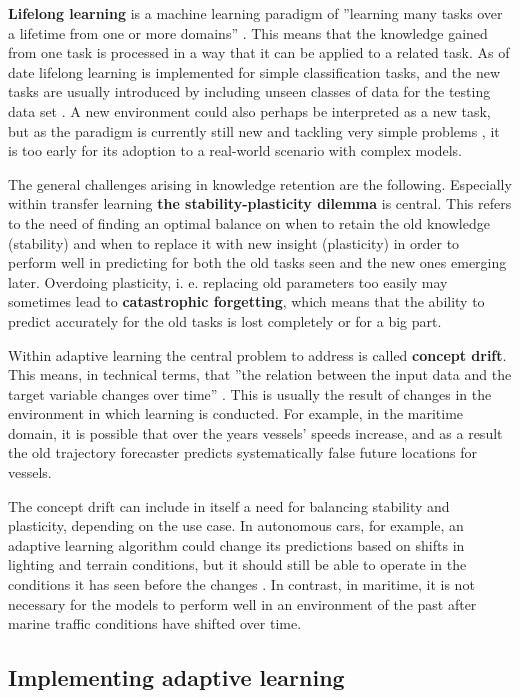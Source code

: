 \textbf{Lifelong learning} is a machine learning paradigm of ''learning many tasks over a lifetime from one or more domains'' \cite{lmlsystems}. This means that the knowledge gained from one task is processed in a way that it can be applied to a related task. As of date lifelong learning is implemented for simple classification tasks, and the new tasks are usually introduced by including unseen classes of data for the testing data set \cite{lmlinneuralnets}. A new environment could also perhaps be interpreted as a new task, but as the paradigm is currently still new and tackling very simple problems \cite{lmlinneuralnets}, it is too early for its adoption to a real-world scenario with complex models.

The general challenges arising in knowledge retention are the following. Especially within transfer learning \textbf{the stability-plasticity dilemma} is central. This refers to the need of finding an optimal balance on when to retain the old knowledge (stability) and when to replace it with new insight (plasticity) in order to perform well in predicting for both the old tasks seen and the new ones emerging later. Overdoing plasticity, i. e. replacing old parameters too easily may sometimes lead to \textbf{catastrophic forgetting}, which means that the ability to predict accurately for the old tasks is lost completely or for a big part.

Within adaptive learning the central problem to address is called \textbf{concept drift}. This means, in technical terms, that ''the relation between the input data and the target variable changes over time'' \cite{conceptdriftsurvey}. This is usually the result of changes in the environment in which learning is conducted. For example, in the maritime domain, it is possible that over the years vessels' speeds increase, and as a result the old trajectory forecaster predicts systematically false future locations for vessels.

The concept drift can include in itself a need for balancing stability and plasticity, depending on the use case. In autonomous cars, for example, an adaptive learning algorithm could change its predictions based on shifts in lighting and terrain conditions, but it should still be able to operate in the conditions it has seen before the changes \cite{conceptdriftsurvey}. In contrast, in maritime, it is not necessary for the models to perform well in an environment of the past after marine traffic conditions have shifted over time.

\subsection{Implementing adaptive learning}

